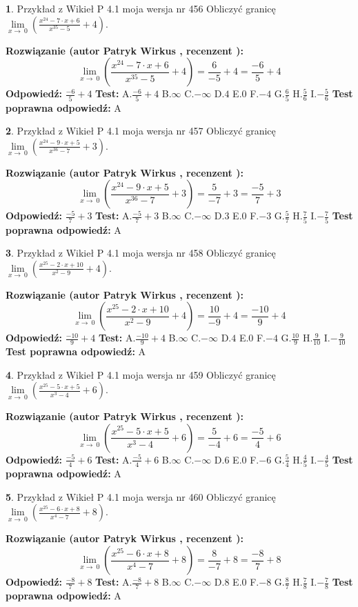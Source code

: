 \documentclass[12pt, a4paper]{article}
\theoremstyle{definition} %
\newtheorem{zad}{}
\newcommand{\zadStart}[1]{\begin{zad}#1\newline}
\newcommand{\zadStop}{\end{zad}}
\newcommand{\rozwStart}[2]{\noindent \textbf{Rozwiązanie (autor #1 , recenzent #2): }\newline}
\newcommand{\rozwStop}{\newline}
\newcommand{\odpStart}{\noindent \textbf{Odpowiedź:}\newline}
\newcommand{\odpStop}{\newline}
\newcommand{\testStart}{\noindent \textbf{Test:}\newline}
\newcommand{\testStop}{\newline}
\newcommand{\kluczStart}{\noindent \textbf{Test poprawna odpowiedź:}\newline}
\newcommand{\kluczStop}{\newline}
\begin{document}
\zadStart{Przykład z Wikieł P 4.1 moja wersja nr 456}
Obliczyć granicę $\lim\limits_{x\to\ 0}(\frac{x^{24}-7 \cdot x +6}{x^{35}-5}+4)$.
\zadStop
\rozwStart{Patryk Wirkus}{}
$$\lim\limits_{x\to\ 0}(\frac{x^{24}-7 \cdot x +6}{x^{35}-5}+4)=\frac{6}{-5}+4=\frac{-6}{5}+4$$
\rozwStop
\odpStart
$\frac{-6}{5}+4$
\odpStop
\testStart
A.$\frac{-6}{5}+4$
B.$\infty$
C.$-\infty$
D.$4$
E.$0$
F.$-4$
G.$\frac{6}{5}$
H.$\frac{5}{6}$
I.$-\frac{5}{6}$
\testStop
\kluczStart
A
\kluczStop



\zadStart{Przykład z Wikieł P 4.1 moja wersja nr 457}
Obliczyć granicę $\lim\limits_{x\to\ 0}(\frac{x^{24}-9 \cdot x +5}{x^{36}-7}+3)$.
\zadStop
\rozwStart{Patryk Wirkus}{}
$$\lim\limits_{x\to\ 0}(\frac{x^{24}-9 \cdot x +5}{x^{36}-7}+3)=\frac{5}{-7}+3=\frac{-5}{7}+3$$
\rozwStop
\odpStart
$\frac{-5}{7}+3$
\odpStop
\testStart
A.$\frac{-5}{7}+3$
B.$\infty$
C.$-\infty$
D.$3$
E.$0$
F.$-3$
G.$\frac{5}{7}$
H.$\frac{7}{5}$
I.$-\frac{7}{5}$
\testStop
\kluczStart
A
\kluczStop



\zadStart{Przykład z Wikieł P 4.1 moja wersja nr 458}
Obliczyć granicę $\lim\limits_{x\to\ 0}(\frac{x^{25}-2 \cdot x +10}{x^{2}-9}+4)$.
\zadStop
\rozwStart{Patryk Wirkus}{}
$$\lim\limits_{x\to\ 0}(\frac{x^{25}-2 \cdot x +10}{x^{2}-9}+4)=\frac{10}{-9}+4=\frac{-10}{9}+4$$
\rozwStop
\odpStart
$\frac{-10}{9}+4$
\odpStop
\testStart
A.$\frac{-10}{9}+4$
B.$\infty$
C.$-\infty$
D.$4$
E.$0$
F.$-4$
G.$\frac{10}{9}$
H.$\frac{9}{10}$
I.$-\frac{9}{10}$
\testStop
\kluczStart
A
\kluczStop



\zadStart{Przykład z Wikieł P 4.1 moja wersja nr 459}
Obliczyć granicę $\lim\limits_{x\to\ 0}(\frac{x^{25}-5 \cdot x +5}{x^{3}-4}+6)$.
\zadStop
\rozwStart{Patryk Wirkus}{}
$$\lim\limits_{x\to\ 0}(\frac{x^{25}-5 \cdot x +5}{x^{3}-4}+6)=\frac{5}{-4}+6=\frac{-5}{4}+6$$
\rozwStop
\odpStart
$\frac{-5}{4}+6$
\odpStop
\testStart
A.$\frac{-5}{4}+6$
B.$\infty$
C.$-\infty$
D.$6$
E.$0$
F.$-6$
G.$\frac{5}{4}$
H.$\frac{4}{5}$
I.$-\frac{4}{5}$
\testStop
\kluczStart
A
\kluczStop



\zadStart{Przykład z Wikieł P 4.1 moja wersja nr 460}
Obliczyć granicę $\lim\limits_{x\to\ 0}(\frac{x^{25}-6 \cdot x +8}{x^{4}-7}+8)$.
\zadStop
\rozwStart{Patryk Wirkus}{}
$$\lim\limits_{x\to\ 0}(\frac{x^{25}-6 \cdot x +8}{x^{4}-7}+8)=\frac{8}{-7}+8=\frac{-8}{7}+8$$
\rozwStop
\odpStart
$\frac{-8}{7}+8$
\odpStop
\testStart
A.$\frac{-8}{7}+8$
B.$\infty$
C.$-\infty$
D.$8$
E.$0$
F.$-8$
G.$\frac{8}{7}$
H.$\frac{7}{8}$
I.$-\frac{7}{8}$
\testStop
\kluczStart
A
\kluczStop
\end{document}
